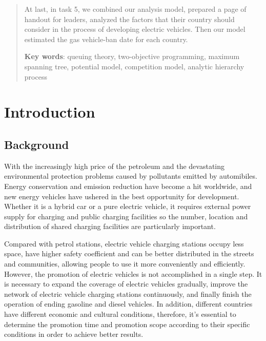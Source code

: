 \documentclass[12pt]{article}  %
\begin{document}
\begin{abstract}
At last, in task 5, we combined our analysis model, prepared a page of handout for leaders, analyzed the factors that their country should consider in the process of developing electric vehicles. Then our model estimated the gas vehicle-ban date for each country.

     \vspace{5pt}
     \textbf{Key words}: queuing theory, two-objective programming, maximum
     spanning tree, potential model, competition model, analytic hierarchy process

\end{abstract}

\maketitle  %
\tableofcontents  %


\section{Introduction}
\subsection{Background}
With the increasingly high price of the petroleum and the devastating environmental protection problems caused by pollutants emitted by automibiles. Energy conservation and emission reduction have become a hit worldwide, and new energy vehicles have ushered in the best opportunity for development. Whether it is a hybrid car or a pure electric vehicle, it requires external power supply for charging and public charging facilities so the number, location and distribution of shared charging facilities are particularly important. 

Compared with petrol stations, electric vehicle charging stations occupy less space, have higher safety coefficient and can be better distributed in the streets and communities, allowing people to use it more conveniently and efficiently. However, the promotion of electric vehicles is not accomplished in a single step. It is necessary to expand the coverage of electric vehicles gradually, improve the network of electric vehicle charging stations continuously, and finally finish the operation of ending gasoline and diesel vehicles. In addition, different countries have different economic and cultural conditions, therefore, it's essential to determine the promotion time and promotion scope according to their specific conditions in order to achieve better results.
\end{document}
